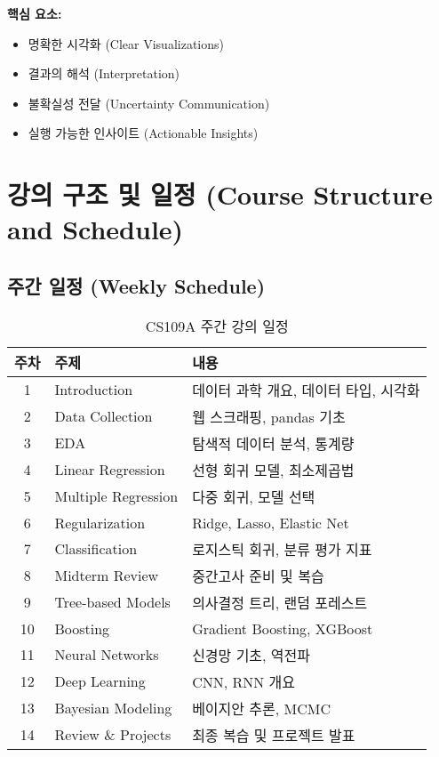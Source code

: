 \documentclass[12pt,a4paper]{article}
\begin{document}
\textbf{핵심 요소:}
\begin{itemize}
    \item 명확한 시각화 (Clear Visualizations)
    \item 결과의 해석 (Interpretation)
    \item 불확실성 전달 (Uncertainty Communication)
    \item 실행 가능한 인사이트 (Actionable Insights)
\end{itemize}

\section{강의 구조 및 일정 (Course Structure and Schedule)}

\subsection{주간 일정 (Weekly Schedule)}

\begin{table}[h]
\centering
\begin{tabular}{|c|l|p{8cm}|}
\hline
\textbf{주차} & \textbf{주제} & \textbf{내용} \\
\hline
1 & Introduction & 데이터 과학 개요, 데이터 타입, 시각화 \\
\hline
2 & Data Collection & 웹 스크래핑, pandas 기초 \\
\hline
3 & EDA & 탐색적 데이터 분석, 통계량 \\
\hline
4 & Linear Regression & 선형 회귀 모델, 최소제곱법 \\
\hline
5 & Multiple Regression & 다중 회귀, 모델 선택 \\
\hline
6 & Regularization & Ridge, Lasso, Elastic Net \\
\hline
7 & Classification & 로지스틱 회귀, 분류 평가 지표 \\
\hline
8 & Midterm Review & 중간고사 준비 및 복습 \\
\hline
9 & Tree-based Models & 의사결정 트리, 랜덤 포레스트 \\
\hline
10 & Boosting & Gradient Boosting, XGBoost \\
\hline
11 & Neural Networks & 신경망 기초, 역전파 \\
\hline
12 & Deep Learning & CNN, RNN 개요 \\
\hline
13 & Bayesian Modeling & 베이지안 추론, MCMC \\
\hline
14 & Review \& Projects & 최종 복습 및 프로젝트 발표 \\
\hline
\end{tabular}
\caption{CS109A 주간 강의 일정}
\end{table}
\end{document}
